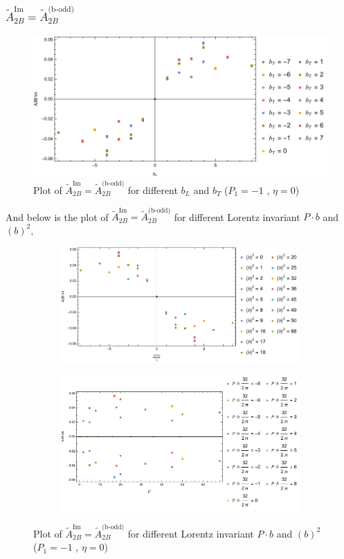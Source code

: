 \documentclass[]{article}
\numberwithin{equation}{section}
\newcommand{\tAmp}{\widetilde{A}}
\newcommand{\tAmp}{\ensuremath{\widetilde{A}^{(+)}}}
\begin{document}
\subsubsection{$\tAmp^{\text{Im}}_{2B}=\tAmp^{\text{(b-odd)}}_{2B}$}
\begin{figure}[h!]
    \centering
    \includegraphics[width=0.45\linewidth]{bLbT_A2B_b_odd_P1_-1_eta_0.pdf}
    \caption{Plot of  $\tAmp^{\text{Im}}_{2B}=\tAmp^{\text{(b-odd)}}_{2B}$ for different $b_{L}$ and $b_{T}$  ($P_{1} = -1$ , $\eta=0$)}
\end{figure}

\pagebreak

And below is the plot of $\tAmp^{\text{Im}}_{2B}=\tAmp^{\text{(b-odd)}}_{2B}$ for different Lorentz invariant $P\cdot b$ and $(b)^2$,
\begin{figure}[h!]
     \centering
     \begin{subfigure}[b]{0.45\textwidth}
         \centering
         \includegraphics[width=\textwidth]{bP_A2B_b_odd_P1_-1_eta_0.pdf}
     \end{subfigure}
     \begin{subfigure}[b]{0.45\textwidth}
         \centering
         \includegraphics[width=\textwidth]{bsq_A2B_b_odd_P1_-1_eta_0.pdf}
     \end{subfigure}
        \caption{Plot of $\tAmp^{\text{Im}}_{2B}=\tAmp^{\text{(b-odd)}}_{2B}$ for different Lorentz invariant $P\cdot b$ and $(b)^2$  ($P_{1} = -1$ , $\eta=0$)}
\end{figure}
\end{document}
